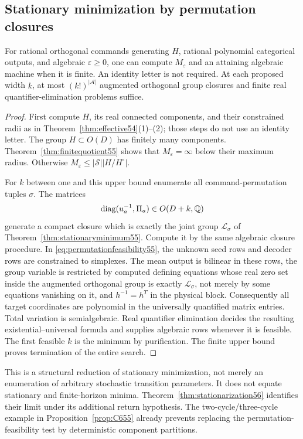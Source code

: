 \subsection{Stationary minimization by permutation closures}
\begin{theorem}\label{thm:effectivemin55}
For rational orthogonal commands generating $H$, rational polynomial categorical outputs, and algebraic $\varepsilon\ge0$, one can compute $M_\varepsilon$ and an attaining algebraic machine when it is finite. An identity letter is not required. At each proposed width $k$, at most $(k!)^{|\mathcal A|}$ augmented orthogonal group closures and finite real quantifier-elimination problems suffice.
\end{theorem}
\begin{proof}
First compute $H$, its real connected components, and their constrained radii as in Theorem~\ref{thm:effective54}(1)--(2); those steps do not use an identity letter. The group $H\subset O(D)$ has finitely many components. Theorem~\ref{thm:finitequotient55} shows that $M_\varepsilon=\infty$ below their maximum radius. Otherwise $M_\varepsilon\le |\mathcal S||H/H^\circ|$.

For $k$ between one and this upper bound enumerate all command-permutation tuples $\sigma$. The matrices
\[
                         \operatorname{diag}(u_a^{-1},\Pi_a)\in O(D+k,\mathbb Q)
\]
generate a compact closure which is exactly the joint group $\mathcal L_\sigma$ of Theorem~\ref{thm:stationaryminimum55}. Compute it by the same algebraic closure procedure. In \eqref{eq:permutationfeasibility55}, the unknown seed rows and decoder rows are constrained to simplexes. The mean output is bilinear in these rows, the group variable is restricted by computed defining equations whose real zero set inside the augmented orthogonal group is exactly $\mathcal L_\sigma$, not merely by some equations vanishing on it, and $h^{-1}=h^T$ in the physical block. Consequently all target coordinates are polynomial in the universally quantified matrix entries. Total variation is semialgebraic. Real quantifier elimination decides the resulting existential--universal formula and supplies algebraic rows whenever it is feasible. The first feasible $k$ is the minimum by purification. The finite upper bound proves termination of the entire search.
\end{proof}
This is a structural reduction of stationary minimization, not merely an enumeration of arbitrary stochastic transition parameters. It does not equate stationary and finite-horizon minima. Theorem~\ref{thm:stationarization56} identifies their limit under its additional return hypothesis. The two-cycle/three-cycle example in Proposition~\ref{prop:C655} already prevents replacing the permutation-feasibility test by deterministic component partitions.

